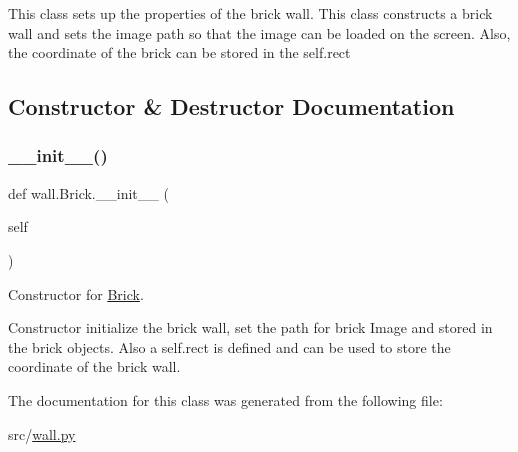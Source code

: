This class sets up the properties of the brick wall. This class constructs a brick wall and sets the image path so that the image can be loaded on the screen. Also, the coordinate of the brick can be stored in the self.\+rect 

\subsection{Constructor \& Destructor Documentation}
\mbox{\label{classwall_1_1_brick_a9ab2fbab8a89de830d2fd433bf326269}} 
\subsubsection{\texorpdfstring{\_\_init\_\_()}{\_\_init\_\_()}}
{\footnotesize\ttfamily def wall.\+Brick.\+\_\+\+\_\+init\+\_\+\+\_\+ (\begin{DoxyParamCaption}\item[{}]{self }\end{DoxyParamCaption})}



Constructor for \mbox{\hyperlink{classwall_1_1_brick}{Brick}}. 

Constructor initialize the brick wall, set the path for brick Image and stored in the brick objects. Also a self.\+rect is defined and can be used to store the coordinate of the brick wall. 

The documentation for this class was generated from the following file\+:\begin{DoxyCompactItemize}
\item 
src/\mbox{\hyperlink{wall_8py}{wall.\+py}}\end{DoxyCompactItemize}
